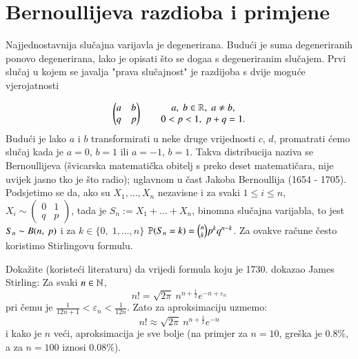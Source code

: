 
\chapter{Bernoullijeva razdioba i primjene}

Najjednostavnija slu\v cajna varijavla je degenerirana.
Budu\' ci je suma degeneriranih ponovo degenerirana, lako je opisati \v sto se doga\dj a s degeneriranim slu\v cajem.
Prvi slu\v caj u kojem se javalja "prava slu\v cajnost" je razdijoba s dvije mogu\' ce vjerojatnosti

\begin{equation*}
    \begin{pmatrix}
        a & b\\
        q & p
    \end{pmatrix}
    \quad \quad
    \begin{matrix}
        a, \; b \in \mathbb{R}, \; a \neq b,\\
        0 < p < 1, \; p + q = 1.
    \end{matrix}
\end{equation*}
Budu\' ci je lako $a$ i $b$ transformirati u neke druge vrijednosti $c$, $d$, promatrati \' cemo slu\v caj kada je $a = 0$, $b = 1$ ili $a = -1$, $b = 1$.
Takva distribucija naziva se Bernoullijeva (\v svicarska matemati\v cka obitelj s preko deset matemati\v cara, nije uvijek jasno tko je \v sto radio); uglavnom u \v cast Jakoba Bernoullija (1654 - 1705).
Podsjetimo se da, ako su $X_1, \ldots, X_n$ nezavisne i za svaki $1 \leq i \leq n$, $X_i \sim \begin{pmatrix} 0 & 1\\ q & p \end{pmatrix}$, tada je $S_n := X_1 + \ldots + X_n$, binomna slu\v cajna varijabla, to jest $S_n \sim B ({n}, \: {p})$ i za $k \in \{0, \; 1, \ldots, n \}$ $\mathbb{P}({S_n = k}) = {n \choose k} p^k q^{n - k}$.
Za ovakve ra\v cune \v cesto koristimo Stirlingovu formulu.

\begin{zad} \label{zad:10.1}
    Doka\v zite (koriste\' ci literaturu) da vrijedi formula koju je 1730. dokazao James Stirling:
    Za svaki $n \in \mathbb{N}$,
    \begin{equation*}
        n! = \sqrt{2 \pi} \: n^{n + \frac{1}{2}} e^{-n + \varepsilon_n}
    \end{equation*}
    pri \v cemu je $\frac{1}{12 n + 1} < \varepsilon_n < \frac{1}{12 n}$.
    Zato za aproksimaciju uzmemo:
    \begin{equation*}
        n! \approx \sqrt{2 \pi} \: n^{n + \frac{1}{2}} e^{-n}
    \end{equation*}
    i kako je $n$ ve\' ci, aproksimacija je sve bolje (na primjer za $n = 10$, gre\v ska je $0.8\%$, a za $n = 100$ iznosi $0.08\%$).
\end{zad}

